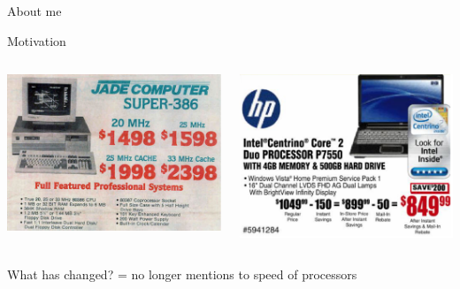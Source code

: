 \documentclass[10pt, notes]{beamer}
\begin{document}
{\begin{frame}{About me}

\end{frame}
}


\begin{frame}{Motivation}
\begin{columns}[T] %
\begin{column}{.5\textwidth}
\includegraphics[width=1.05\linewidth]{img/old_ad}
\end{column}%
\hfill%
\begin{column}{.5\textwidth}
\includegraphics[width=\linewidth]{img/2006_ad}
\end{column}%
\end{columns}
What has changed?
 = no longer mentions to speed of processors
\end{frame}
\end{document}
